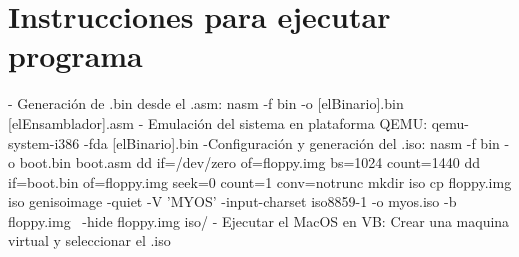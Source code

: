 \documentclass{report}
\begin{document}
\newpage
\section{Instrucciones para ejecutar programa}
\newline
- Generaci\'on de .bin desde el .asm: \newline
nasm -f bin -o [elBinario].bin [elEnsamblador].asm\newline
\newline
- Emulaci\'on del sistema en plataforma QEMU: \newline
qemu-system-i386 -fda [elBinario].bin \newline
\newline
-Configuraci\'on y generaci\'on del .iso: \newline
nasm -f bin -o boot.bin boot.asm \newline
dd if=/dev/zero of=floppy.img bs=1024 count=1440\newline
dd if=boot.bin of=floppy.img seek=0 count=1 conv=notrunc\newline
mkdir iso\newline
cp floppy.img iso
genisoimage -quiet -V 'MYOS' -input-charset iso8859-1 -o myos.iso -b floppy.img \
    -hide floppy.img iso/
\newline
\newline
- Ejecutar el MacOS en VB: \newline
Crear una maquina virtual y seleccionar el .iso
\newpage
\end{document}

